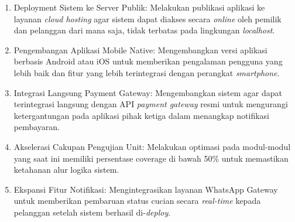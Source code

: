 \begin{enumerate}
    \item Deployment Sistem ke Server Publik: Melakukan publikasi aplikasi ke layanan \textit{cloud hosting} agar sistem dapat diakses secara \textit{online} oleh pemilik dan pelanggan dari mana saja, tidak terbatas pada lingkungan \textit{localhost}.
    \item Pengembangan Aplikasi Mobile Native: Mengembangkan versi aplikasi berbasis Android atau iOS untuk memberikan pengalaman pengguna yang lebih baik dan fitur yang lebih terintegrasi dengan perangkat \textit{smartphone}.
    \item Integrasi Langsung Payment Gateway: Mengembangkan sistem agar dapat terintegrasi langsung dengan API \textit{payment gateway} resmi untuk mengurangi ketergantungan pada aplikasi pihak ketiga dalam menangkap notifikasi pembayaran.
    \item Akselerasi Cakupan Pengujian Unit: Melakukan optimasi pada modul-modul yang saat ini memiliki persentase coverage di bawah 50\% untuk memastikan ketahanan alur logika sistem.
    \item Ekspansi Fitur Notifikasi: Mengintegrasikan layanan WhatsApp Gateway untuk memberikan pembaruan status cucian secara \textit{real-time} kepada pelanggan setelah sistem berhasil di-\textit{deploy}.
\end{enumerate}